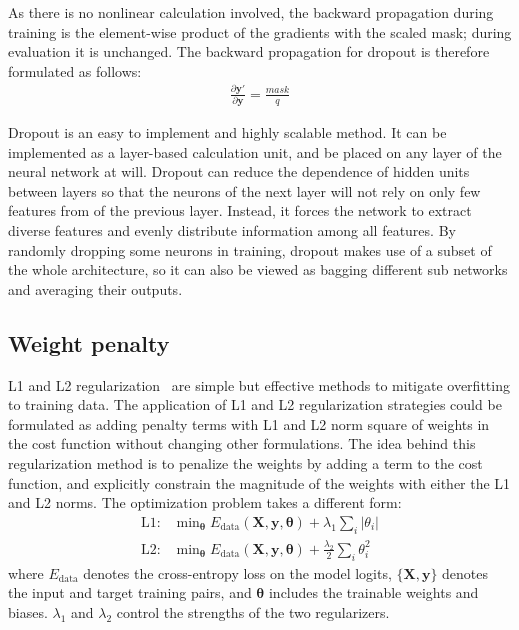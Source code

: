 \documentclass{article}
\begin{document}
As there is no nonlinear calculation involved, the backward propagation during training is the element-wise product of the gradients with the scaled mask; during evaluation it is unchanged. 
The backward propagation for dropout is therefore formulated as follows:
\begin{align}
    \frac{\partial \bm{y}'}{\partial \bm{y}} = \frac{mask}{q}
\end{align}

Dropout is an easy to implement and highly scalable method. 
It can be implemented as a layer-based calculation unit, and be placed on any layer of the neural network at will. 
Dropout can reduce the dependence of hidden units between layers so that the neurons of the next layer will not rely on only few features from of the previous layer.
Instead, it forces the network to extract diverse features and evenly distribute information among all features. 
By randomly dropping some neurons in training, dropout makes use of a subset of the whole architecture, so it can also be viewed as bagging different sub networks and averaging their outputs.


\subsection{Weight penalty}

L1 and L2 regularization~\cite{ng2004feature} are simple but effective methods to mitigate overfitting to training data. 
The application of L1 and L2 regularization strategies could be formulated as adding penalty terms with L1 and L2 norm square of weights in the cost function without changing other formulations. 
The idea behind this regularization method is to penalize the weights by adding a term to the cost function, and explicitly constrain the magnitude of the weights with either the L1 and L2 norms.
The optimization problem takes a different form:
\begin{align}
    \text{L1: } & \text{min}_{\bm{\theta}} \; E_{\text{data}}(\bm{X}, \bm{y}, \bm{\theta}) + \lambda_1 \sum_i|\theta_i|\\
    \text{L2: } & \text{min}_{\bm{\theta}} \; E_{\text{data}}(\bm{X}, \bm{y}, \bm{\theta}) + \frac{\lambda_2}{2}\sum_i\theta_i^2
\end{align}
where $E_{\text{data}}$ denotes the cross-entropy loss on the model logits, $\{\bm{X}, \bm{y}\}$ denotes the input and target training pairs, and $\bm{\theta}$ includes the trainable weights and biases. 
$\lambda_1$ and $\lambda_2$ control the strengths of the two regularizers.
\end{document}
